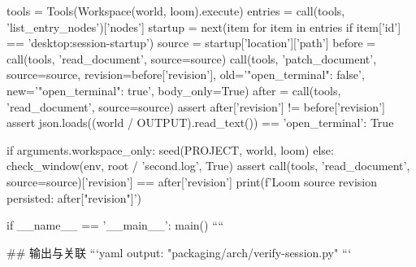         tools = Tools(Workspace(world, loom).execute)
        entries = call(tools, 'list_entry_nodes')['nodes']
        startup = next(item for item in entries if item['id'] == 'desktop:session-startup')
        source = startup['location']['path']
        before = call(tools, 'read_document', source=source)
        call(tools, 'patch_document', source=source, revision=before['revision'],
             old='"open_terminal": false', new='"open_terminal": true', body_only=True)
        after = call(tools, 'read_document', source=source)
        assert after['revision'] != before['revision']
        assert json.loads((world / OUTPUT).read_text()) == {'open_terminal': True}

        if arguments.workspace_only:
            seed(PROJECT, world, loom)
        else:
            check_window(env, root / 'second.log', True)
        assert call(tools, 'read_document', source=source)['revision'] == after['revision']
        print(f'Loom source revision persisted: {after["revision"]}')


if __name__ == '__main__':
    main()
````

## 输出与关联
```yaml
output: "packaging/arch/verify-session.py"
```
